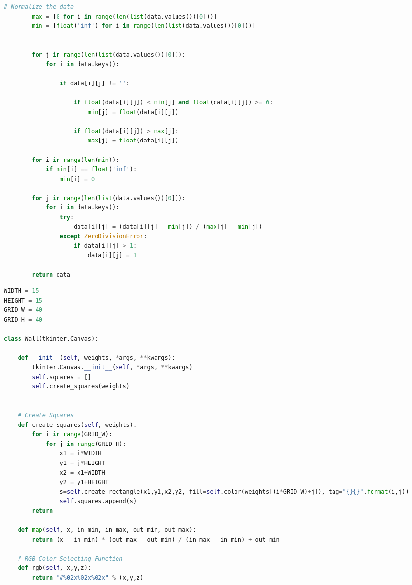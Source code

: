 \documentclass[12pt]{report} %
\begin{document}
\begin{changemargin}{-1cm}{-1cm}
\begin{lstlisting}[language=python, caption= {Class containing world bank data read as a CSV file, and normalized between 0 and 1}, captionpos=b]
        # Normalize the data
        max = [0 for i in range(len(list(data.values())[0]))]
        min = [float('inf') for i in range(len(list(data.values())[0]))]

        
        for j in range(len(list(data.values())[0])):
            for i in data.keys():

                if data[i][j] != '':

                    if float(data[i][j]) < min[j] and float(data[i][j]) >= 0:
                        min[j] = float(data[i][j])

                    if float(data[i][j]) > max[j]:
                        max[j] = float(data[i][j])
        
        for i in range(len(min)):
            if min[i] == float('inf'):
                min[i] = 0
        
        for j in range(len(list(data.values())[0])):
            for i in data.keys():
                try:
                    data[i][j] = (data[i][j] - min[j]) / (max[j] - min[j])
                except ZeroDivisionError:
                    if data[i][j] > 1:
                        data[i][j] = 1

        return data
\end{lstlisting}
\begin{lstlisting}[language=python, caption= {Code to create a visualization of the SOM using Tkinter}, captionpos=b]
WIDTH = 15
HEIGHT = 15
GRID_W = 40
GRID_H = 40

class Wall(tkinter.Canvas):

    def __init__(self, weights, *args, **kwargs):
        tkinter.Canvas.__init__(self, *args, **kwargs)
        self.squares = []
        self.create_squares(weights)


    # Create Squares
    def create_squares(self, weights):
        for i in range(GRID_W):
            for j in range(GRID_H):
                x1 = i*WIDTH
                y1 = j*HEIGHT
                x2 = x1+WIDTH
                y2 = y1+HEIGHT
                s=self.create_rectangle(x1,y1,x2,y2, fill=self.color(weights[(i*GRID_W)+j]), tag="{}{}".format(i,j))
                self.squares.append(s)
        return
    
    def map(self, x, in_min, in_max, out_min, out_max):
        return (x - in_min) * (out_max - out_min) / (in_max - in_min) + out_min

    # RGB Color Selecting Function
    def rgb(self, x,y,z):
        return "#%02x%02x%02x" % (x,y,z)


\end{lstlisting}
\end{changemargin}
\end{document}
